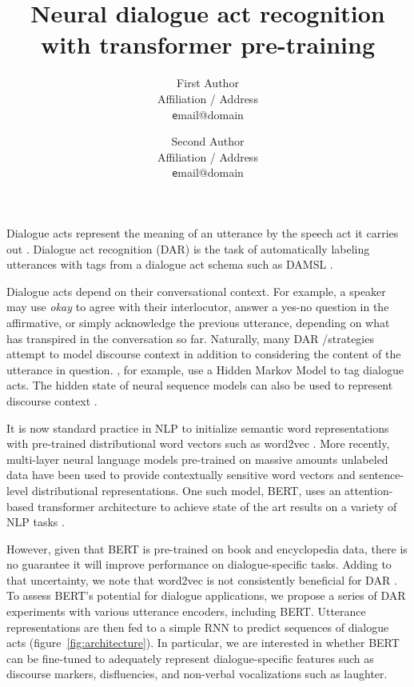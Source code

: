\documentclass[11pt,a4paper,headings=standardclasses]{article}
\title{Neural dialogue act recognition with transformer pre-training} %
\author{
  First Author \\
  Affiliation / Address \\
  {\texttt email@domain} \\\and
  Second Author \\
  Affiliation / Address \\
  {\texttt email@domain} \\
}
\date{}
\begin{document}
\maketitle

Dialogue acts represent the meaning of an utterance by the speech act it carries out \citep{austinHowThingsWords2009}.
Dialogue act recognition (DAR) is the task of automatically labeling utterances with tags from a dialogue act schema such as DAMSL \citep{coreCodingDialogsDAMSL1997}.

Dialogue acts depend on their conversational context.
For example, a speaker may use \textit{okay} to agree with their interlocutor, answer a yes-no question in the affirmative, 
or simply acknowledge the previous utterance, depending on what has transpired in the conversation so far.
Naturally, many DAR /strategies attempt to model discourse context in addition to considering the content of the utterance in question.
\cite{stolckeDialogueActModeling2000}, for example, use a Hidden Markov Model to tag dialogue acts.
The hidden state of neural sequence models can also be used to represent discourse context 
\citep[e.g.][]{kalchbrennerRecurrentConvolutionalNeural2013,tranPreservingDistributionalInformation2017}.


It is now standard practice in NLP to initialize semantic word representations
with pre-trained distributional word vectors such as word2vec \citep{mikolov2013distributed}.
More recently, multi-layer neural language models pre-trained on massive amounts unlabeled data
have been used to provide contextually sensitive word vectors and sentence-level distributional representations.
One such model, BERT, uses an attention-based transformer architecture to achieve state of the art results
on a variety of NLP tasks \citep{devlinBERTPretrainingDeep2018}.

However, given that BERT is pre-trained on book and encyclopedia data, 
there is no guarantee it will improve performance on dialogue-specific tasks.
Adding to that uncertainty, we note that word2vec is not consistently beneficial for DAR \citep{cerisaraEffectsUsingWord2vec2017}.
To assess BERT's potential for dialogue applications, we propose a series of DAR experiments 
with various utterance encoders, including BERT.
Utterance representations are then fed to a simple RNN to predict sequences of dialogue acts (figure~\ref{fig:architecture}).
In particular, we are interested in whether BERT can be fine-tuned to adequately represent
dialogue-specific features such as discourse markers, disfluencies, and non-verbal vocalizations such as laughter. 
\end{document}
